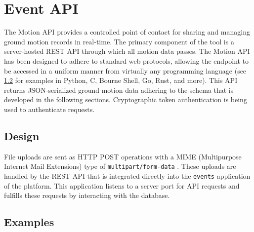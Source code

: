 \chapter{Event API}\label{ch:event-api}
\begingroup 


The \BRACE{} Motion API provides a controlled point of contact for sharing and managing ground motion records in real-time. The primary component of the tool is a server-hosted REST API through which all motion data passes. 
The Motion API has been designed to adhere to standard web protocols, allowing the endpoint to be accessed in a uniform manner from virtually any programming language (see \cref{sec:api-examples} for examples in Python, C, Bourne Shell, Go, Rust, and more). 
This API returns JSON-serialized ground motion data adhering to the schema that is developed in the following sections. Cryptographic token authentication is being used to authenticate requests.

\hypertarget{design}{%
\section{Design}\label{design}}

File uploads are sent as HTTP POST operations with a MIME (Multipurpose Internet Mail Extensions) type of
\texttt{multipart/form-data} \citep{freed1996multipurpose}.
These uploads are handled by the REST API that is integrated directly into the \texttt{events} application of the \BRACE{} platform. %
This application listens to a server port for API requests and fulfills these requests by interacting with the database.



\section{Examples}\label{sec:api-examples}


\endgroup